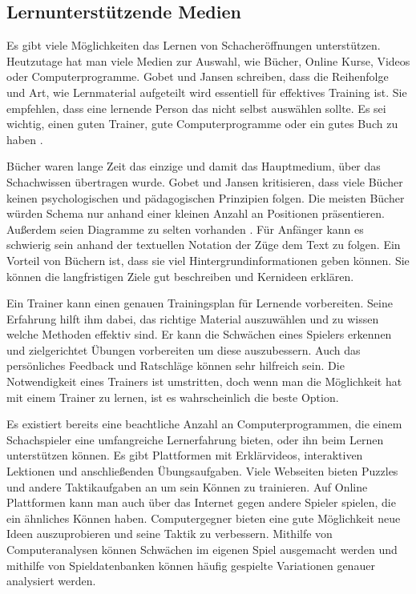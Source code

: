 \subsection{Lernunterstützende Medien}
Es gibt viele Möglichkeiten das Lernen von Schacheröffnungen unterstützen. Heutzutage hat man viele Medien zur Auswahl, wie Bücher, Online Kurse, Videos oder Computerprogramme. Gobet und Jansen schreiben, dass die Reihenfolge und Art, wie Lernmaterial aufgeteilt wird essentiell für effektives Training ist. Sie empfehlen, dass eine lernende Person das nicht selbst auswählen sollte. Es sei wichtig, einen guten Trainer, gute Computerprogramme oder ein gutes Buch zu haben \cite{gobet_training_2006}.

Bücher waren lange Zeit das einzige und damit das Hauptmedium, über das Schachwissen übertragen wurde. Gobet und Jansen kritisieren, dass viele Bücher keinen psychologischen und pädagogischen Prinzipien folgen. Die meisten Bücher würden Schema nur anhand einer kleinen Anzahl an Positionen präsentieren. Außerdem seien Diagramme zu selten vorhanden \cite{gobet_training_2006}. Für Anfänger kann es schwierig sein anhand der textuellen Notation der Züge dem Text zu folgen. Ein Vorteil von Büchern ist, dass sie viel Hintergrundinformationen geben können. Sie können die langfristigen Ziele gut beschreiben und Kernideen erklären.

Ein Trainer kann einen genauen Trainingsplan für Lernende vorbereiten.
Seine Erfahrung hilft ihm dabei, das richtige Material auszuwählen und zu wissen welche Methoden effektiv sind.
Er kann die Schwächen eines Spielers erkennen und zielgerichtet Übungen vorbereiten um diese auszubessern. Auch das persönliches Feedback und Ratschläge können sehr hilfreich sein. Die Notwendigkeit eines Trainers ist umstritten, doch wenn man die Möglichkeit hat mit einem Trainer zu lernen, ist es wahrscheinlich die beste Option.
\cite{gobet_training_2006}

Es existiert bereits eine beachtliche Anzahl an Computerprogrammen, die einem Schachspieler eine umfangreiche Lernerfahrung bieten, oder ihn beim Lernen unterstützen können. Es gibt Plattformen mit Erklärvideos, interaktiven Lektionen und anschließenden Übungsaufgaben. Viele Webseiten bieten Puzzles und andere Taktikaufgaben an um sein Können zu trainieren. Auf Online Plattformen kann man auch über das Internet gegen andere Spieler spielen, die ein ähnliches Können haben. Computergegner bieten eine gute Möglichkeit neue Ideen auszuprobieren und seine Taktik zu verbessern. Mithilfe von Computeranalysen können Schwächen im eigenen Spiel ausgemacht werden und mithilfe von Spieldatenbanken können häufig gespielte Variationen genauer analysiert werden.

